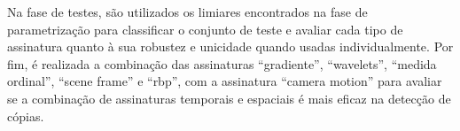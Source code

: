Na fase de testes, são utilizados os limiares encontrados na fase de parametrização para classificar o conjunto de teste e avaliar cada tipo de assinatura quanto à sua robustez e unicidade quando usadas individualmente. Por fim, é realizada a combinação das assinaturas ``gradiente'', ``wavelets'', ``medida ordinal'', ``scene frame'' e ``rbp'', com a assinatura ``camera motion'' para avaliar se a combinação de assinaturas temporais e espaciais é mais eficaz na detecção de cópias.
